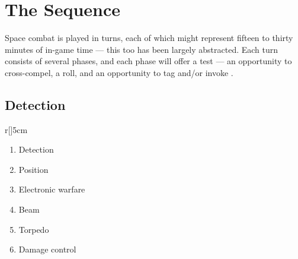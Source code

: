 \section{The Sequence}\label{sec:The Sequence}

Space combat is played in turns, each of which might represent fifteen to thirty minutes of in-game time --- this too has been largely abstracted. Each turn consists of several phases, and each phase will offer a test --- an opportunity to cross-compel, a roll, and an opportunity to tag and/or invoke \Aspects.

\subsection{Detection}
\label{sec:Detection}



\begin{wraptable}{r}[\sidebarwidth]{5cm}
\centering
\newsavebox{\hbbox}%
\begin{lrbox}{\hbbox}
\begin{minipage}[c]{4.5cm}
\begin{enumerate}
\item Detection
\item Position
\item Electronic warfare
\item Beam
\item Torpedo
\item Damage control
\end{enumerate}
\end{minipage}
\end{lrbox}
\colorbox{sbbackground}{\usebox{\hbbox}}
\end{wraptable}

